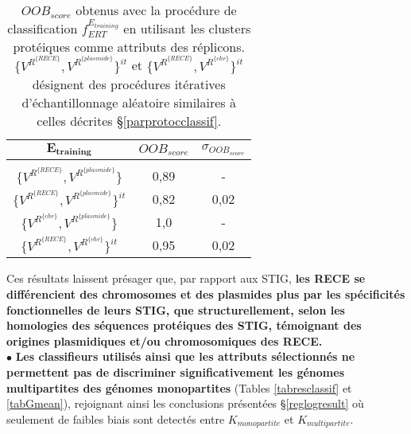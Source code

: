 \begin{table}[H]
\centering
\caption[$OOB_{score}$ obtenus avec ERT et les clusters protéiques en tant qu'attributs]{$OOB_{score}$ obtenus avec la procédure de classification $f_{ERT}^{E_{training}}$ en utilisant les clusters protéiques comme attributs des réplicons. \\ $\{V^{R^{\{RECE\}}},V^{R^{\{plasmide\}}}\}^{it}$ et $\{V^{R^{\{RECE\}}},V^{R^{\{chr\}}}\}^{it}$ désignent des procédures itératives d'échantillonnage aléatoire similaires à celles décrites \S \ref{parprotocclassif}.} \label{tabscoreoob}

\begin{tabular}{c|cc}
$\mathbf{E_{training}}$& $OOB_{score}$ & $\sigma_{OOB_{score}}$\\
\hline
\\[-0.2cm]
$\{V^{R^{\{RECE\}}},V^{R^{\{plasmide\}}}\}$&0,89 & -\\
$\{V^{R^{\{RECE\}}},V^{R^{\{plasmide\}}}\}^{it}$&0,82 & 0,02\\
$\{V^{R^{\{chr\}}},V^{R^{\{plasmide\}}}\}$&1,0& -\\
$\{V^{R^{\{RECE\}}},V^{R^{\{chr\}}}\}^{it}$&0,95 & 0,02\\
\end{tabular}
\end{table}	  

Ces résultats laissent présager que, par rapport aux STIG, \textbf{\color{orange} les RECE se différencient des chromosomes et des plasmides plus par les spécificités fonctionnelles de leurs STIG, que structurellement, selon les homologies des séquences protéiques des STIG, témoignant des origines plasmidiques et/ou chromosomiques des RECE.} \\	 
	 

$\bullet$  \textbf{Les classifieurs utilisés ainsi que les attributs sélectionnés ne permettent pas de discriminer significativement les génomes multipartites des génomes monopartites} (Tables \ref{tabresclassif} et \ref{tabGmean}), rejoignant ainsi les conclusions présentées \S \ref{reglogresult} où seulement de faibles biais sont detectés entre $K_{monopartite}$ et $K_{multipartite}$. 

